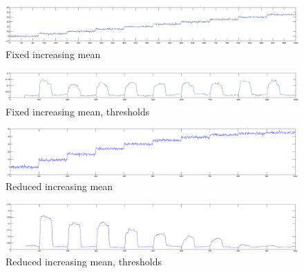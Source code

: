 
\begin{figure}
\centering
  \includegraphics[width=1\textwidth]{./Figures/notes/camci_fixed_increasing_mean.eps}
  \caption[Fixed increasing mean]{Fixed increasing mean}
  \label{fig:camci_fixed_increasing_mean}
\end{figure}

\begin{figure}
\centering
  \includegraphics[width=1\textwidth]{./Figures/notes/camci_fixed_increasing_mean_thresholds.eps}
  \caption[Fixed increasing mean, thresholds]{Fixed increasing mean, thresholds}
  \label{fig:camci_fixed_increasing_mean_thresholds}
\end{figure}


\begin{figure}
\centering
  \includegraphics[width=1\textwidth]{./Figures/notes/takeuchi_reduced_increasing_mean.eps}
  \caption[Reduced increasing mean]{Reduced increasing mean}
  \label{fig:takeuchi_reduced_increasing_mean}
\end{figure}

\begin{figure}
\centering
  \includegraphics[width=1\textwidth]{./Figures/notes/takeuchi_reduced_increasing_mean_thresholds.eps}
  \caption[Reduced increasing mean, thresholds]{Reduced increasing mean, thresholds}
  \label{fig:takeuchi_reduced_increasing_mean_thresholds}
\end{figure}


